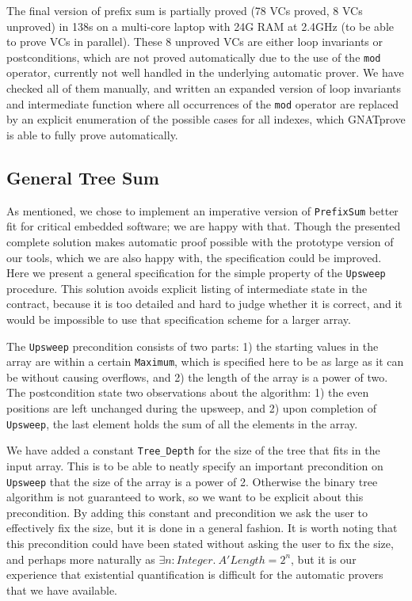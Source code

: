 \documentclass[sttt,final]{svjour}
\newcommand{\gnatprove}{GNATprove\xspace}
\begin{document}
The final version of prefix sum is partially proved (78 VCs proved, 8 VCs
%
%
unproved) in 138s on a multi-core laptop with 24G RAM at 2.4GHz (to
be able to prove VCs in parallel).  These 8 unproved VCs are either loop
invariants or postconditions, which are not proved automatically due to the use
of the \verb|mod| operator, currently not well handled in the underlying
automatic prover. We have checked all of them manually, and written an expanded
version of loop invariants and intermediate function where all occurrences of
the \verb|mod| operator are replaced by an explicit enumeration of the possible
cases for all indexes, which \gnatprove is able to fully prove automatically.

\subsection{General  Tree Sum}
As mentioned, we chose to implement an imperative version of
\verb|PrefixSum| better fit for critical embedded software; we are happy
with that. Though the presented complete solution makes automatic
proof possible with the prototype version of our tools, which we are
also happy with, the specification could be improved. Here we present
a general specification for the simple property of the \verb|Upsweep|
procedure. This solution avoids explicit listing of intermediate state in the
contract, because it is too detailed and hard to judge whether it is
correct, and it would be impossible to use that specification scheme
for a larger array.

The \verb|Upsweep| precondition consists of two parts: 1) the starting
values in the array are within a certain \verb|Maximum|, which is
specified here to be as large as it can be without causing overflows,
and 2) the length of the array is a power of two. The postcondition
state two observations about the algorithm: 1) the even positions are
left unchanged during the upsweep, and 2) upon completion of
\verb|Upsweep|, the last element holds the sum of all the elements in
the array.

We have added a constant \verb|Tree_Depth| for the size of the tree
that fits in the input array. This is to be able to neatly specify an
important precondition on \verb|Upsweep| that the size of the array is
a power of 2. Otherwise the binary tree algorithm is not guaranteed to
work, so we want to be explicit about this precondition. By adding
this constant and precondition we ask the user to effectively fix the
size, but it is done in a general fashion. It is worth noting that
this precondition could have been stated without asking the user to fix
the size, and perhaps more naturally as $\exists n: \mathit{Integer}.~ A'\mathit{Length} = 2^n$, but it is our experience that existential quantification is
difficult for the automatic provers that we have available.
\end{document}

